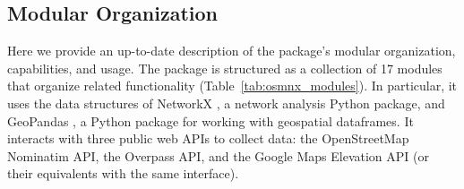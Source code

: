 \documentclass[12pt,letterpaper]{article} %
\begin{document}
\subsection{Modular Organization}\label{sec:modular_organization}

Here we provide an up-to-date description of the package's modular organization, capabilities, and usage. The package is structured as a collection of 17 modules that organize related functionality (Table~\ref{tab:osmnx_modules}). In particular, it uses the data structures of NetworkX \citep{hagberg_exploring_2008}, a network analysis Python package, and GeoPandas \citep{van_den_bossche_geopandasgeopandas_2024}, a Python package for working with geospatial dataframes. It interacts with three public web APIs to collect data: the OpenStreetMap Nominatim API, the Overpass API, and the Google Maps Elevation API (or their equivalents with the same interface).
\end{document}
